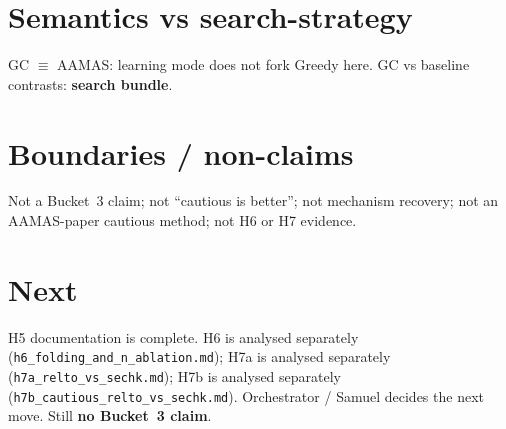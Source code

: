 \documentclass[11pt]{article}
\begin{document}
\section{Semantics vs search-strategy}

GC $\equiv$ AAMAS: learning mode does not fork Greedy here.
GC vs baseline contrasts: \textbf{search bundle}.

\section{Boundaries / non-claims}

Not a Bucket~3 claim; not ``cautious is better''; not mechanism recovery;
not an AAMAS-paper cautious method; not H6 or H7 evidence.

\section{Next}

H5 documentation is complete.
H6 is analysed separately (\texttt{h6\_folding\_and\_n\_ablation.md}); H7a is
analysed separately (\texttt{h7a\_relto\_vs\_sechk.md}); H7b is analysed
separately (\texttt{h7b\_cautious\_relto\_vs\_sechk.md}).
Orchestrator / Samuel decides the next move.
Still \textbf{no Bucket~3 claim}.
\end{document}
